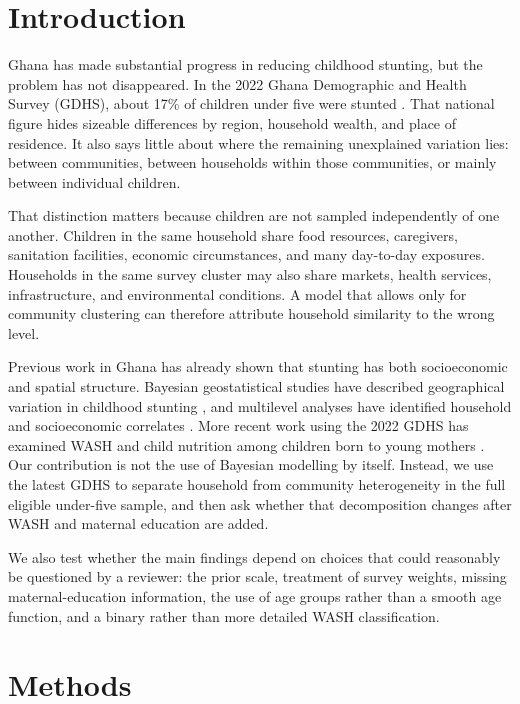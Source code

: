 \documentclass[11pt]{article}
\begin{document}
\section{Introduction}

Ghana has made substantial progress in reducing childhood stunting, but the problem has not disappeared. In the 2022 Ghana Demographic and Health Survey (GDHS), about 17\% of children under five were stunted \citep{GSSICF2024}. That national figure hides sizeable differences by region, household wealth, and place of residence. It also says little about where the remaining unexplained variation lies: between communities, between households within those communities, or mainly between individual children.

That distinction matters because children are not sampled independently of one another. Children in the same household share food resources, caregivers, sanitation facilities, economic circumstances, and many day-to-day exposures. Households in the same survey cluster may also share markets, health services, infrastructure, and environmental conditions. A model that allows only for community clustering can therefore attribute household similarity to the wrong level.

Previous work in Ghana has already shown that stunting has both socioeconomic and spatial structure. Bayesian geostatistical studies have described geographical variation in childhood stunting \citep{AhetoDagne2021,AmoakoJohnson2022}, and multilevel analyses have identified household and socioeconomic correlates \citep{AhetoEtAl2015,IddrisuGyabaah2023}. More recent work using the 2022 GDHS has examined WASH and child nutrition among children born to young mothers \citep{OgumEtAl2026}. Our contribution is not the use of Bayesian modelling by itself. Instead, we use the latest GDHS to separate household from community heterogeneity in the full eligible under-five sample, and then ask whether that decomposition changes after WASH and maternal education are added.

We also test whether the main findings depend on choices that could reasonably be questioned by a reviewer: the prior scale, treatment of survey weights, missing maternal-education information, the use of age groups rather than a smooth age function, and a binary rather than more detailed WASH classification.

\section{Methods}
\end{document}
